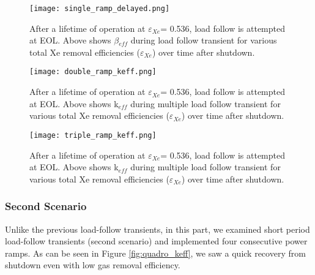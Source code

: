     \begin{figure}[htbp!]
        \begin{center}
            \texttt{[image: single\_ramp\_delayed.png]}
        \end{center}
        \caption{After a lifetime of operation at $\varepsilon$$_{Xe}$= 0.536, 
            load follow is attempted at EOL. Above shows $\beta$$_{eff}$ during 
            load
        follow transient for various total Xe removal efficiencies
        ($\varepsilon$$_{Xe}$) over time after shutdown.}
        \label{fig:single_delayed}
    \end{figure}

    \begin{figure}[htbp!]
        \begin{center}
            \texttt{[image: double\_ramp\_keff.png]}
        \end{center}
        \caption{After a lifetime of operation at $\varepsilon$$_{Xe}$= 0.536, 
            load follow is attempted at EOL. Above shows k$_{eff}$ during 
            multiple load follow transient for various total Xe removal 
            efficiencies
        ($\varepsilon$$_{Xe}$) over time after shutdown.}
        \label{fig:double_keff}
    \end{figure}

    \begin{figure}[htbp!]
        \begin{center}
            \texttt{[image: triple\_ramp\_keff.png]}
        \end{center}
        \caption{After a lifetime of operation at $\varepsilon$$_{Xe}$= 0.536, 
            load follow is attempted at EOL. Above shows  k$_{eff}$ during 
            multiple load follow transient for various total Xe removal 
            efficiencies
        ($\varepsilon$$_{Xe}$) over time after shutdown.}
        \label{fig:triple_keff}
    \end{figure}

\newpage
\FloatBarrier

\subsubsection{Second Scenario}

    Unlike the previous load-follow transients, in this part, we examined short 
    period load-follow transients (second scenario) and implemented four 
    consecutive power ramps. As can be seen in Figure \ref{fig:quadro_keff}, we 
    saw a quick recovery from shutdown even with low gas removal efficiency.

